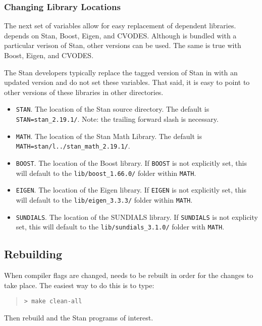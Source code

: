 \subsubsection{Changing Library Locations}

The next set of variables allow for easy replacement of dependent
libraries. \CmdStan depends on Stan, Boost, Eigen, and
CVODES. Although \CmdStan is bundled with a particular verison of
Stan, other versions can be used. The same is true with Boost, Eigen,
and CVODES.

The Stan developers typically replace the tagged version of Stan in
 with an updated version and do not set
these variables. That said, it is easy to point \CmdStan to other
versions of these libraries in other directories.
%
\begin{itemize}
  \item \Verb|STAN|. The location of the Stan source
    directory. The default is \Verb|STAN=stan_2.19.1/|. Note: the
    trailing forward slash is necessary.
  \item \Verb|MATH|. The location of the Stan Math Library. The
    default is \Verb|MATH=stan/l../stan_math_2.19.1/|.
  \item \Verb|BOOST|. The location of the Boost library. If
    \Verb|BOOST| is not explicitly set, this will default to the
    \Verb|lib/boost_1.66.0/| folder within \Verb|MATH|.
  \item \Verb|EIGEN|. The location of the Eigen library. If
    \Verb|EIGEN| is not explicitly set, this will default to the
    \Verb|lib/eigen_3.3.3/| folder within \Verb|MATH|.
  \item \Verb|SUNDIALS|. The location of the SUNDIALS library. If
    \Verb|SUNDIALS| is not explicity set, this will default to the
    \Verb|lib/sundials_3.1.0/| folder with \Verb|MATH|.
\end{itemize}
%


\subsection{Rebuilding \CmdStan}

When compiler flags are changed, \CmdStan needs to be rebuilt in order
for the changes to take place. The easiest way to do this is to type:
%
\begin{quote}
  \begin{Verbatim}[fontshape=sl]
> make clean-all
  \end{Verbatim}
\end{quote}
%
Then rebuild \CmdStan and the Stan programs of interest.


